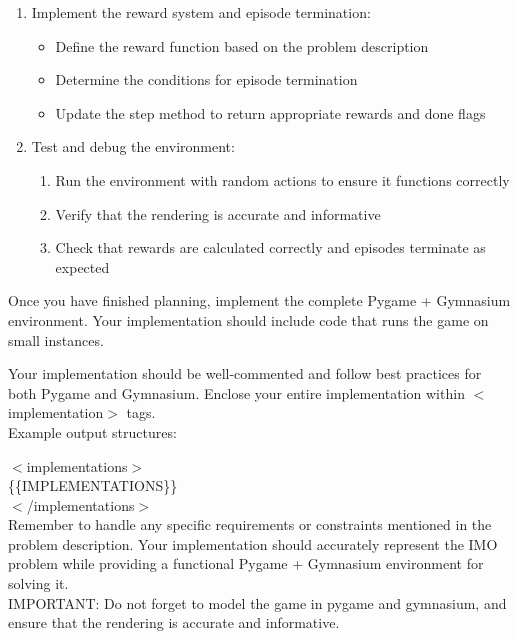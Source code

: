 {\begin{tcolorbox}
\begin{enumerate}
\item Implement the reward system and episode termination:
\begin{itemize}
\item Define the reward function based on the problem description
\item Determine the conditions for episode termination
\item Update the step method to return appropriate rewards and done flags
\end{itemize}

\item Test and debug the environment:
\begin{enumerate}
   \item Run the environment with random actions to ensure it functions correctly
   \item Verify that the rendering is accurate and informative
   \item Check that rewards are calculated correctly and episodes terminate as expected
\end{enumerate}

\end{enumerate}

Once you have finished planning, implement the complete Pygame + Gymnasium environment. Your implementation should include code that runs the game on small instances.

Your implementation should be well-commented and follow best practices for both Pygame and Gymnasium. Enclose your entire implementation within $<$implementation$>$ tags. \\

Example output structures:

$<$implementations$>$\\
\{\{IMPLEMENTATIONS\}\}\\
$<$/implementations$>$ \\

Remember to handle any specific requirements or constraints mentioned in the problem description. Your implementation should accurately represent the IMO problem while providing a functional Pygame + Gymnasium environment for solving it. \\

IMPORTANT: Do not forget to model the game in pygame and gymnasium, and ensure that the rendering is accurate and informative.
\setlength{\parskip}{1em}
\end{tcolorbox}



}
